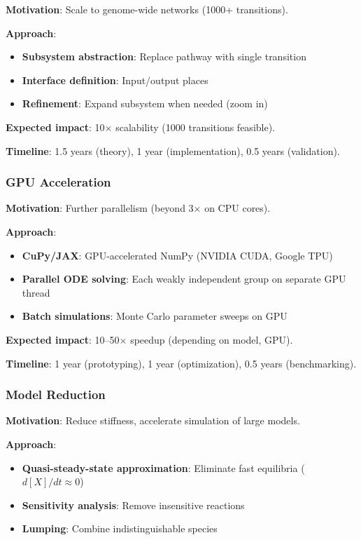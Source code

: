 \textbf{Motivation}: Scale to genome-wide networks (1000+ transitions).

\textbf{Approach}:
\begin{itemize}
    \item \textbf{Subsystem abstraction}: Replace pathway with single transition
    \item \textbf{Interface definition}: Input/output places
    \item \textbf{Refinement}: Expand subsystem when needed (zoom in)
\end{itemize}

\textbf{Expected impact}: 10$\times$ scalability (1000 transitions feasible).

\textbf{Timeline}: 1.5 years (theory), 1 year (implementation), 0.5 years (validation).

\subsubsection{GPU Acceleration}

\textbf{Motivation}: Further parallelism (beyond 3$\times$ on CPU cores).

\textbf{Approach}:
\begin{itemize}
    \item \textbf{CuPy/JAX}: GPU-accelerated NumPy (NVIDIA CUDA, Google TPU)
    \item \textbf{Parallel ODE solving}: Each weakly independent group on separate GPU thread
    \item \textbf{Batch simulations}: Monte Carlo parameter sweeps on GPU
\end{itemize}

\textbf{Expected impact}: 10--50$\times$ speedup (depending on model, GPU).

\textbf{Timeline}: 1 year (prototyping), 1 year (optimization), 0.5 years (benchmarking).

\subsubsection{Model Reduction}

\textbf{Motivation}: Reduce stiffness, accelerate simulation of large models.

\textbf{Approach}:
\begin{itemize}
    \item \textbf{Quasi-steady-state approximation}: Eliminate fast equilibria ($d[X]/dt \approx 0$)
    \item \textbf{Sensitivity analysis}: Remove insensitive reactions
    \item \textbf{Lumping}: Combine indistinguishable species
\end{itemize}

